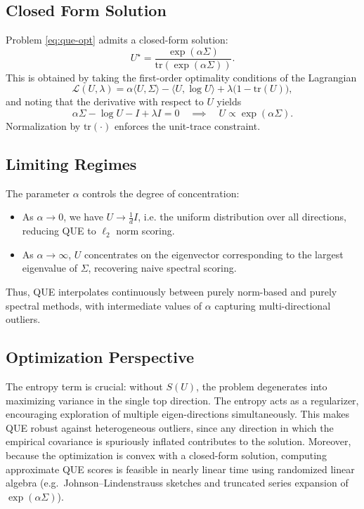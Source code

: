 \documentclass[11pt]{article}
\begin{document}
\subsection{Closed Form Solution}
Problem \eqref{eq:que-opt} admits a closed-form solution:
\[
    U^\star = \frac{\exp(\alpha \Sigma)}{\mathrm{tr}\!\left( \exp(\alpha \Sigma) \right)}.
\]
This is obtained by taking the first-order optimality conditions of the Lagrangian
\[
    \mathcal{L}(U,\lambda) = \alpha \langle U, \Sigma \rangle - \langle U, \log U \rangle
    + \lambda \big( 1 - \mathrm{tr}(U) \big),
\]
and noting that the derivative with respect to $U$ yields
\[
    \alpha \Sigma - \log U - I + \lambda I = 0
    \quad \implies \quad
    U \propto \exp(\alpha \Sigma).
\]
Normalization by $\mathrm{tr}(\cdot)$ enforces the unit-trace constraint.

\subsection{Limiting Regimes}
The parameter $\alpha$ controls the degree of concentration:
\begin{itemize}
    \item As $\alpha \to 0$, we have $U \to \tfrac{1}{d} I$, i.e. the uniform distribution over
    all directions, reducing QUE to $\ell_2$ norm scoring.
    \item As $\alpha \to \infty$, $U$ concentrates on the eigenvector corresponding to the largest
    eigenvalue of $\Sigma$, recovering naive spectral scoring.
\end{itemize}
Thus, QUE interpolates continuously between purely norm-based and purely spectral methods, with
intermediate values of $\alpha$ capturing multi-directional outliers.

\subsection{Optimization Perspective}
The entropy term is crucial: without $S(U)$, the problem degenerates into maximizing variance in the
single top direction. The entropy acts as a regularizer, encouraging exploration of multiple
eigen-directions simultaneously. This makes QUE robust against heterogeneous outliers, since any
direction in which the empirical covariance is spuriously inflated contributes to the solution.
Moreover, because the optimization is convex with a closed-form solution, computing approximate QUE
scores is feasible in nearly linear time using randomized linear algebra (e.g.\ Johnson–Lindenstrauss
sketches and truncated series expansion of $\exp(\alpha \Sigma)$).
\end{document}
